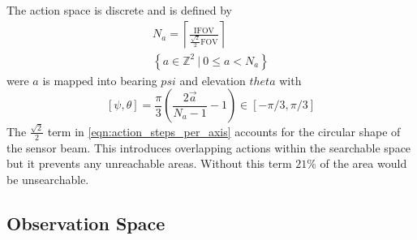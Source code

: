 The action space is discrete and is defined by
\begin{gather}
   N_a =  \left\lceil\frac{\mathrm{IFOV}}{ \frac{\sqrt{2}}{2}\mathrm{FOV}}\right\rceil \label{eqn:action_steps_per_axis} \\
    \left\{a \in \mathbb{Z}^2 ~|~ 0 \leq a < N_a\right\}
\end{gather}
were $a$ is mapped into bearing $psi$ and elevation $theta$ with
\begin{equation}\label{eq:actionToBearings}
    [\psi, \theta] = \frac{\pi}{3}
    \left(
    \frac
        {2 \vec a }
        { N_a - 1}
    -1
    \right) \in [-\pi/3, \pi/3]
\end{equation}
The $\frac{\sqrt{2}}{2}$ term in \eqref{eqn:action_steps_per_axis} accounts for the circular shape of the sensor beam. This introduces overlapping actions within the searchable space but it prevents any unreachable areas. Without this term $21\%$ of the area would be unsearchable.


\subsection{Observation Space}
\label{sect:method_observation_space}

